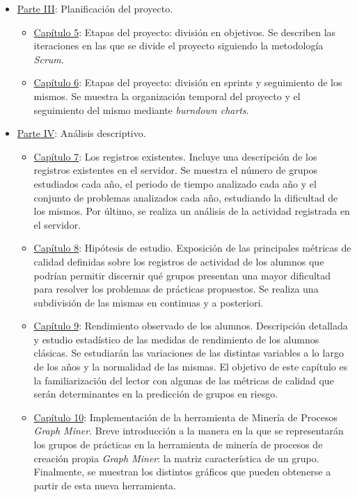 \begin{itemize}
\begin{itemize}
\end{itemize}
\item \hyperref[sec:parteIV]{Parte III}: Planificación del proyecto.
\begin{itemize}
\item \hyperref[chapter:objetivos]{Capítulo 5}: Etapas del proyecto: división en objetivos. Se describen las iteraciones en las que se divide el proyecto siguiendo la metodología \emph{Scrum}.
\item \hyperref[chapter:sprints]{Capítulo 6}: Etapas del proyecto: división en sprints y seguimiento de los mismos. Se muestra la organización temporal del proyecto y el seguimiento del mismo mediante \emph{burndown charts}.
\end{itemize}
\item \hyperref[sec:parteIII]{Parte IV}: Análisis descriptivo.
\begin{itemize}
\item \hyperref[sec:chapterVI]{Capítulo 7}: Los registros existentes.  Incluye una descripción de los registros existentes en el servidor. Se muestra el número de grupos estudiados cada año, el periodo de tiempo analizado cada año y el conjunto de problemas analizados cada año, estudiando la dificultad de los mismos. Por último, se realiza un análisis de la actividad registrada en el servidor.
\item \hyperref[sec:chapterVII]{Capítulo 8}: Hipótesis de estudio. Exposición de las principales métricas de calidad definidas sobre los registros de actividad de los alumnos que podrían permitir discernir qué grupos presentan una mayor dificultad para resolver los problemas de prácticas propuestos. Se realiza una subdivisión de las mismas en continuas y a posteriori.
\item \hyperref[chapter:rendimiento]{Capítulo 9}: Rendimiento observado de los alumnos. Descripción detallada y estudio estadístico de las medidas de rendimiento de los alumnos clásicas. Se estudiarán las variaciones de las distintas variables a lo largo de los años y la normalidad de las mismas. El objetivo de este capítulo es la familiarización del lector con algunas de las métricas de calidad que serán determinantes en la predicción de grupos en riesgo.
\item \hyperref[sec:chapterIV]{Capítulo 10}: Implementación de la herramienta de Minería de Procesos \emph{Graph Miner}. Breve introducción a la manera en la que se representarán los grupos de prácticas en la herramienta de minería de procesos de creación propia \emph{Graph Miner}: la matriz característica de un grupo. Finalmente, se muestran los distintos gráficos que pueden obtenerse a partir de esta nueva herramienta.

\end{itemize}
\end{itemize}
